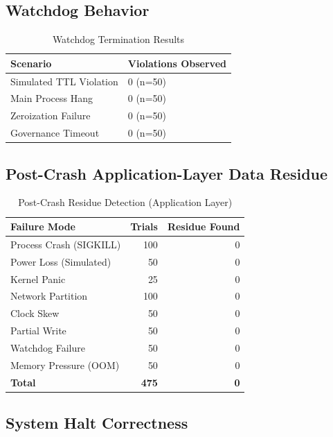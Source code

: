 \documentclass[conference]{IEEEtran}
\begin{document}
\subsection{Watchdog Behavior}

\begin{table}[htbp]
\caption{Watchdog Termination Results}
\centering
\begin{tabular}{l l}
\toprule
\textbf{Scenario} & \textbf{Violations Observed} \\
\midrule
Simulated TTL Violation & 0 (n=50) \\
Main Process Hang & 0 (n=50) \\
Zeroization Failure & 0 (n=50) \\
Governance Timeout & 0 (n=50) \\
\bottomrule
\end{tabular}
\label{tab:watchdog}
\end{table}

\subsection{Post-Crash Application-Layer Data Residue}

\begin{table}[htbp]
\caption{Post-Crash Residue Detection (Application Layer)}
\centering
\begin{tabular}{l r r}
\toprule
\textbf{Failure Mode} & \textbf{Trials} & \textbf{Residue Found} \\
\midrule
Process Crash (SIGKILL) & 100 & 0 \\
Power Loss (Simulated) & 50 & 0 \\
Kernel Panic & 25 & 0 \\
Network Partition & 100 & 0 \\
Clock Skew & 50 & 0 \\
Partial Write & 50 & 0 \\
Watchdog Failure & 50 & 0 \\
Memory Pressure (OOM) & 50 & 0 \\
\textbf{Total} & \textbf{475} & \textbf{0} \\
\bottomrule
\end{tabular}
\label{tab:residue}
\end{table}

\subsection{System Halt Correctness}
\end{document}
